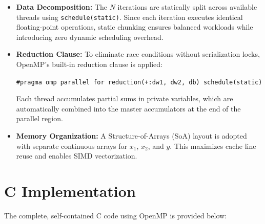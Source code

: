 \documentclass[12pt]{article}
\begin{document}
\begin{itemize}
    \item \textbf{Data Decomposition:} The $N$ iterations are statically split across available threads using \texttt{schedule(static)}. Since each iteration executes identical floating-point operations, static chunking ensures balanced workloads while introducing zero dynamic scheduling overhead.
    \item \textbf{Reduction Clause:} To eliminate race conditions without serialization locks, OpenMP's built-in reduction clause is applied:
    \begin{center}
    \texttt{\#pragma omp parallel for reduction(+:dw1, dw2, db) schedule(static)}
    \end{center}
    Each thread accumulates partial sums in private variables, which are automatically combined into the master accumulators at the end of the parallel region.
    \item \textbf{Memory Organization:} A Structure-of-Arrays (SoA) layout is adopted with separate continuous arrays for $x_1$, $x_2$, and $y$. This maximizes cache line reuse and enables SIMD vectorization.
\end{itemize}

\newpage
\section{C Implementation}
The complete, self-contained C code using OpenMP is provided below:
\end{document}
